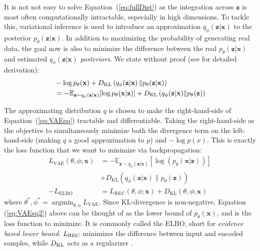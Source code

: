 It is not not easy to solve Equation~(\ref{eq:fullDist}) as the integration across $\mathbf{z}$ is most often computationally intractable, especially in high dimensions.  To tackle this, variational inference \citep[e.g.][]{Jordan1999} is used to introduce an approximation $q_{\phi}(\mathbf{z}|\mathbf{x})$ to the posterior $p_{\theta}(\mathbf{z}|\mathbf{x})$. In addition to maximizing the probability of generating real data, the goal now is also to minimize the difference between the real $p_{\theta}(\mathbf{z}|\mathbf{x})$ and estimated $q_{\phi}(\mathbf{z}|\mathbf{x})$ {\it posteriors}. We state without proof (see \cite{kingma2019introduction} for detailed derivation):%
\begin{align}
    &-\log p_{\theta}(\mathbf{x}) + D_{\rm KL}\left(q_{\phi}(\mathbf{z}|\mathbf{x}\right) \| p_{\theta}(\mathbf{z}|\mathbf{x})) \nonumber \\ 
    &= -\mathbb{E}_{\mathbf{z} \sim q_{\phi}(\mathbf{z}|\mathbf{x})} [ \log p_\theta(\mathbf{x} | \mathbf{z})] + D_{\rm KL}\left(q_\phi(\mathbf{z}|\mathbf{x}) \| p_\theta(\mathbf{z})\right) \label{eq:VAEeq}
\end{align}

The approximating distribution $q$ is chosen to make the right-hand-side of Equation~(\ref{eq:VAEeq}) tractable and differentiable. Taking the right-hand-side as the objective to simultaneously minimize both the divergence term on the left-hand-side (making $q$ a good approximation to $p$) and $-\log p(x)$. This is exactly the loss function that we want to minimize via backpropagation:%
\begin{align}
L_{\mathrm{VAE}}(\theta, \phi; \mathbf{x}) & = -\mathbb{E}_{\mathbf{z} \sim q_{\phi}(\mathbf{z} | \mathbf{x})} \left[\log(p_{\theta}(\mathbf{x} | \mathbf{z}))\right] \nonumber \\
&+D_{\mathrm{KL}}\left(q_{\phi}(\mathbf{z} | \mathbf{x}) \| p_{\theta}(\mathbf{z})\right) \nonumber \\
-L_\mathrm{ELBO} &= L_{\mathrm{REC}}(\theta, \phi; \mathbf{x}) + D_{\mathrm{KL}}(\theta, \phi; \mathbf{x}) \label{eq:VAEeq2}
\end{align}
where $\theta^{*}, \phi^{*} = \mathop{\mathrm{argmin}}_{\theta, \phi} L_{\mathrm{VAE}}$. Since KL-divergence is non-negative, Equation (\ref{eq:VAEeq2}) above can be thought of as the lower bound of $p_{\theta}(\mathbf{x})$, and is the loss function to minimize. It is commonly called the ELBO, short for {\it {evidence based lower bound}}. $L_{\rm{REC}}$ minimizes the difference between input and encoded samples, while $D_{\rm{KL}}$ acts as a regularizer \citep{KLregularizer}.

